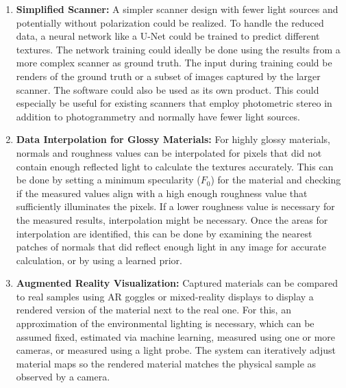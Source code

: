 \documentclass[11pt, twoside, listof=totocnumbered, bibliography=totocnumbered]{scrartcl}
\begin{document}
\begin{enumerate}
		\item \textbf{Simplified Scanner:} A simpler scanner design with fewer light sources and potentially without polarization could be realized. To handle the reduced data, a neural network like a U-Net could be trained to predict different textures. The network training could ideally be done using the results from a more complex scanner as ground truth. The input during training could be renders of the ground truth or a subset of images captured by the larger scanner. The software could also be used as its own product. This could especially be useful for existing scanners that employ photometric stereo in addition to photogrammetry and normally have fewer light sources.
		
		\item \textbf{Data Interpolation for Glossy Materials:} For highly glossy materials, normals and roughness values can be interpolated for pixels that did not contain enough reflected light to calculate the textures accurately. This can be done by setting a minimum specularity ($F_0$) for the material and checking if the measured values align with a high enough roughness value that sufficiently illuminates the pixels. If a lower roughness value is necessary for the measured results, interpolation might be necessary. Once the areas for interpolation are identified, this can be done by examining the nearest patches of normals that did reflect enough light in any image for accurate calculation, or by using a learned prior.
		
		\item \textbf{Augmented Reality Visualization:} Captured materials can be compared to real samples using AR goggles or mixed-reality displays to display a rendered version of the material next to the real one. For this, an approximation of the environmental lighting is necessary, which can be assumed fixed, estimated via machine learning, measured using one or more cameras, or measured using a light probe. The system can iteratively adjust material maps so the rendered material matches the physical sample as observed by a camera.
		

\end{enumerate}
\end{document}
